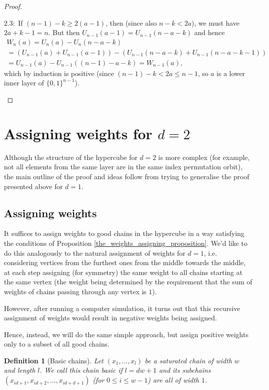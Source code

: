 \documentclass[11pt, reqno]{amsart}
\newenvironment{caseindent}[1][2em]
  {%
    \begin{list}{}{%
      \setlength{\leftmargin}{#1}%
      \setlength{\rightmargin}{0pt}%
      \setlength{\topsep}{0pt}%
      \setlength{\partopsep}{0pt}%
      \setlength{\itemsep}{0pt}%
      \setlength{\parsep}{\parskip}%
      \setlength{\listparindent}{\parindent}%
    }%
    \item[]%
    \let\fullwidthdisplay\relax
    \ignorespaces
  }
  {%
    \end{list}%
    \ignorespacesafterend
  }
\newcommand{\leanblueprintbase}{https://mj141592.github.io/weighted-chains-paper}
\newif\ifleanlinks
\newcommand{\leanblueprint}[1]{%
  \ifleanlinks
    \leavevmode\unskip\penalty9999\hbox{}\nobreak\hfill\quad
    \href{\leanblueprintbase/theorems/#1/}{%
      \mbox{\normalfont\footnotesize\textcolor{blue}{[\textsf{Lean formalisation}]}}}%
    \par\nobreak
  \fi
}
\newtheorem{definition}[theorem]{Definition}
\theoremstyle{remark}
\numberwithin{equation}{section}
\newcommand{\uno}{U_{n-1}}
\begin{document}
\begin{proof}
\begin{caseindent}
    $2.3:$ If $(n-1)-k \geqslant 2(a-1)$, then (since also $n-k<2a$), we must have $2a+k-1=n$. But then $U_{n-1}(a-1)=U_{n-1}(n-a-k)$ and hence
    \begin{multline*}
        W_n(a)=U_n(a) - U_n(n-a-k)\\
        =(\uno(a) + \uno(a-1))-(\uno(n-a-k) + \uno(n-a-k-1))\\
        =U_{n-1}(a)-U_{n-1}((n-1)-a-k)=W_{n-1}(a),
    \end{multline*}
    which by induction is positive (since $(n-1)-k<2a \leqslant n-1$, so $a$ is a lower inner layer of $\{0, 1\}^{n-1}$). \qedhere
\end{caseindent}
\end{proof}

\section{Assigning weights for \texorpdfstring{$d=2$}{d=2}}
\label{section_d2}

Although the structure of the hypercube for $d=2$ is more complex (for example, not all elements from the same layer are in the same index permutation orbit), the main outline of the proof and ideas follow from trying to generalise the proof presented above for $d=1$.

\subsection{Assigning weights}
\label{d2_weights_assignement_subsection}

It suffices to assign weights to good chains in the hypercube in a way satisfying the conditions of Proposition \ref{the_weights_assigning_proposition}. We'd like to do this analogously to the natural assignment of weights for $d=1$, i.e. considering vertices from the furthest ones from the middle towards the middle, at each step assigning (for symmetry) the same weight to all chains starting at the same vertex (the weight being determined by the requirement that the sum of weights of chains passing through any vertex is $1$).

However, after running a computer simulation, it turns out that this recursive assignment of weights would result in negative weights being assigned.

Hence, instead, we will do the same simple approach, but assign positive weights only to a subset of all good chains.

\begin{definition}[Basic chains]
\label{wc:def:basic-chain}
    Let $(x_1, \ldots, x_l)$ be a saturated chain of width $w$ and length $l$. We call this chain basic if $l=dw+1$ and its subchains $(x_{id+1}, x_{id+2}, \ldots, x_{id+d+1})$ (for $0 \leqslant i \leqslant w-1$) are all of width $1$.
\leanblueprint{basic-chain}
\end{definition}
\end{document}
